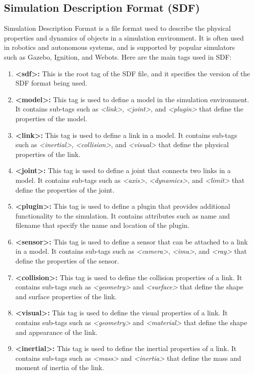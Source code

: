\documentclass[12pt,oneside]{article}
\begin{document}
\subsection{Simulation Description Format (SDF)}\label{sdf}
Simulation Description Format is a file format used to describe the physical properties and dynamics of objects in a simulation environment. It is often used in robotics and autonomous systems, and is supported by popular simulators such as Gazebo, Ignition, and Webots. Here are the main tags used in SDF:
\begin{enumerate}
\item \textbf{<sdf>:} This is the root tag of the SDF file, and it specifies the version of the SDF format being used.
\item \textbf{<model>:} This tag is used to define a model in the simulation environment. It contains sub-tags such as \textit{<link>},\textit{ <joint>}, and \textit{<plugin>} that define the properties of the model.
\item \textbf{<link>: }This tag is used to define a link in a model. It contains sub-tags such as \textit{<inertial>}, \textit{<collision>}, and \textit{<visual> }that define the physical properties of the link.
\item \textbf{<joint>:} This tag is used to define a joint that connects two links in a model. It contains sub-tags such as \textit{<axis>}, \textit{<dynamics>}, and \textit{<limit>} that define the properties of the joint.
\item \textbf{<plugin>:} This tag is used to define a plugin that provides additional functionality to the simulation. It contains attributes such as name and filename that specify the name and location of the plugin.
\item \textbf{<sensor>:} This tag is used to define a sensor that can be attached to a link in a model. It contains sub-tags such as \textit{<camera>}, \textit{<imu>}, and \textit{<ray>} that define the properties of the sensor.
\item \textbf{<collision>:} This tag is used to define the collision properties of a link. It contains sub-tags such as \textit{<geometry>} and \textit{<surface>} that define the shape and surface properties of the link.
\item \textbf{<visual>:} This tag is used to define the visual properties of a link. It contains sub-tags such as \textit{<geometry>} and \textit{<material>} that define the shape and appearance of the link.
\item \textbf{<inertial>:} This tag is used to define the inertial properties of a link. It contains sub-tags such as \textit{<mass>} and \textit{<inertia>} that define the mass and moment of inertia of the link.

\end{enumerate}
\end{document}
